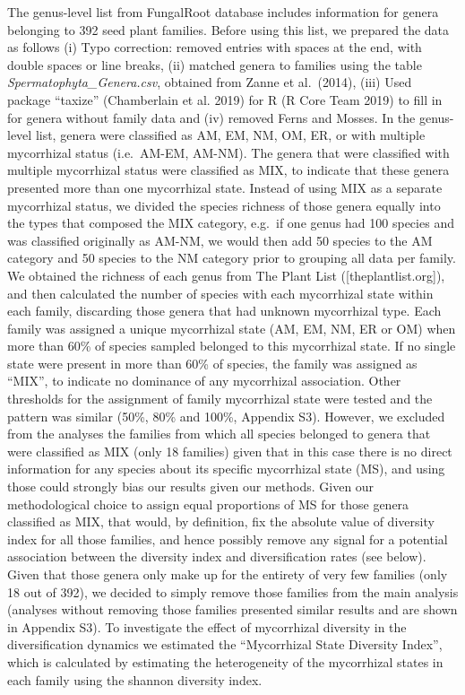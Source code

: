 \documentclass[12pt,]{article}
\begin{document}
The genus-level list from FungalRoot database includes information for
genera belonging to 392 seed plant families. Before using this list, we
prepared the data as follows (i) Typo correction: removed entries with
spaces at the end, with double spaces or line breaks, (ii) matched
genera to families using the table \emph{Spermatophyta\_Genera.csv},
obtained from Zanne et al.~(2014), (iii) Used package ``taxize''
(Chamberlain et al. 2019) for R (R Core Team 2019) to fill in for genera
without family data and (iv) removed Ferns and Mosses. In the
genus-level list, genera were classified as AM, EM, NM, OM, ER, or with
multiple mycorrhizal status (i.e.~AM-EM, AM-NM). The genera that were
classified with multiple mycorrhizal status were classified as MIX, to
indicate that these genera presented more than one mycorrhizal state.
Instead of using MIX as a separate mycorrhizal status, we divided the
species richness of those genera equally into the types that composed
the MIX category, e.g.~if one genus had 100 species and was classified
originally as AM-NM, we would then add 50 species to the AM category and
50 species to the NM category prior to grouping all data per family. We
obtained the richness of each genus from The Plant List
({[}theplantlist.org{]}), and then calculated the number of species with
each mycorrhizal state within each family, discarding those genera that
had unknown mycorrhizal type. Each family was assigned a unique
mycorrhizal state (AM, EM, NM, ER or OM) when more than 60\% of species
sampled belonged to this mycorrhizal state. If no single state were
present in more than 60\% of species, the family was assigned as
``MIX'', to indicate no dominance of any mycorrhizal association. Other
thresholds for the assignment of family mycorrhizal state were tested
and the pattern was similar (50\%, 80\% and 100\%, Appendix S3).
However, we excluded from the analyses the families from which all
species belonged to genera that were classified as MIX (only 18
families) given that in this case there is no direct information for any
species about its specific mycorrhizal state (MS), and using those could
strongly bias our results given our methods. Given our methodological
choice to assign equal proportions of MS for those genera classified as
MIX, that would, by definition, fix the absolute value of diversity
index for all those families, and hence possibly remove any signal for a
potential association between the diversity index and diversification
rates (see below). Given that those genera only make up for the entirety
of very few families (only 18 out of 392), we decided to simply remove
those families from the main analysis (analyses without removing those
families presented similar results and are shown in Appendix S3). To
investigate the effect of mycorrhizal diversity in the diversification
dynamics we estimated the ``Mycorrhizal State Diversity Index'', which
is calculated by estimating the heterogeneity of the mycorrhizal states
in each family using the shannon diversity index.
\end{document}
